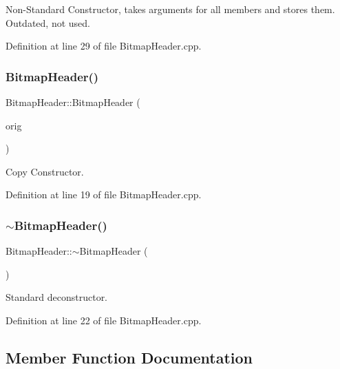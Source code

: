 Non-\/\+Standard Constructor, takes arguments for all members and stores them. Outdated, not used. 



Definition at line 29 of file Bitmap\+Header.\+cpp.

\mbox{\label{classBitmapHeader_a25a5481f49d70a8c42a9efc17f17fd48}} 
\subsubsection{\texorpdfstring{BitmapHeader()}{BitmapHeader()}\hspace{0.1cm}{\footnotesize\ttfamily [4/4]}}
{\footnotesize\ttfamily Bitmap\+Header\+::\+Bitmap\+Header (\begin{DoxyParamCaption}\item[{const \mbox{\hyperlink{classBitmapHeader}{Bitmap\+Header}} \&}]{orig }\end{DoxyParamCaption})}



Copy Constructor. 



Definition at line 19 of file Bitmap\+Header.\+cpp.

\mbox{\label{classBitmapHeader_a4e102d5fe9a8619fca7319b148ec23d1}} 
\subsubsection{\texorpdfstring{$\sim$BitmapHeader()}{~BitmapHeader()}}
{\footnotesize\ttfamily Bitmap\+Header\+::$\sim$\+Bitmap\+Header (\begin{DoxyParamCaption}{ }\end{DoxyParamCaption})\hspace{0.3cm}{\ttfamily [virtual]}}

Standard deconstructor. 

Definition at line 22 of file Bitmap\+Header.\+cpp.



\subsection{Member Function Documentation}
\mbox{\label{classBitmapHeader_aa02e59db95074c6a96a44dac03cee77b}} 
